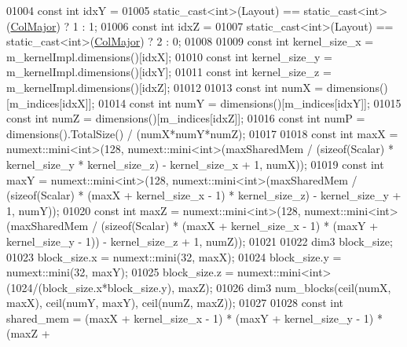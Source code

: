 \begin{DoxyCode}
01004         \textcolor{keyword}{const} \textcolor{keywordtype}{int} idxY =
01005             \textcolor{keyword}{static\_cast<}\textcolor{keywordtype}{int}\textcolor{keyword}{>}(Layout) == static\_cast<int>(\hyperlink{group__enums_ggaacded1a18ae58b0f554751f6cdf9eb13a0cbd4bdd0abcfc0224c5fcb5e4f6669a}{ColMajor}) ? 1 : 1;
01006         \textcolor{keyword}{const} \textcolor{keywordtype}{int} idxZ =
01007             \textcolor{keyword}{static\_cast<}\textcolor{keywordtype}{int}\textcolor{keyword}{>}(Layout) == static\_cast<int>(\hyperlink{group__enums_ggaacded1a18ae58b0f554751f6cdf9eb13a0cbd4bdd0abcfc0224c5fcb5e4f6669a}{ColMajor}) ? 2 : 0;
01008 
01009         \textcolor{keyword}{const} \textcolor{keywordtype}{int} kernel\_size\_x = m\_kernelImpl.dimensions()[idxX];
01010         \textcolor{keyword}{const} \textcolor{keywordtype}{int} kernel\_size\_y = m\_kernelImpl.dimensions()[idxY];
01011         \textcolor{keyword}{const} \textcolor{keywordtype}{int} kernel\_size\_z = m\_kernelImpl.dimensions()[idxZ];
01012 
01013         \textcolor{keyword}{const} \textcolor{keywordtype}{int} numX = dimensions()[m\_indices[idxX]];
01014         \textcolor{keyword}{const} \textcolor{keywordtype}{int} numY = dimensions()[m\_indices[idxY]];
01015         \textcolor{keyword}{const} \textcolor{keywordtype}{int} numZ = dimensions()[m\_indices[idxZ]];
01016         \textcolor{keyword}{const} \textcolor{keywordtype}{int} numP = dimensions().TotalSize() / (numX*numY*numZ);
01017 
01018         \textcolor{keyword}{const} \textcolor{keywordtype}{int} maxX = numext::mini<int>(128, numext::mini<int>(maxSharedMem / (\textcolor{keyword}{sizeof}(Scalar) * 
      kernel\_size\_y * kernel\_size\_z) - kernel\_size\_x + 1, numX));
01019         \textcolor{keyword}{const} \textcolor{keywordtype}{int} maxY = numext::mini<int>(128, numext::mini<int>(maxSharedMem / (\textcolor{keyword}{sizeof}(Scalar) * (maxX + 
      kernel\_size\_x - 1) * kernel\_size\_z) - kernel\_size\_y + 1, numY));
01020         \textcolor{keyword}{const} \textcolor{keywordtype}{int} maxZ = numext::mini<int>(128, numext::mini<int>(maxSharedMem / (\textcolor{keyword}{sizeof}(Scalar) * (maxX + 
      kernel\_size\_x - 1) * (maxY + kernel\_size\_y - 1)) - kernel\_size\_z + 1, numZ));
01021 
01022         dim3 block\_size;
01023         block\_size.x = numext::mini(32, maxX);
01024         block\_size.y = numext::mini(32, maxY);
01025         block\_size.z = numext::mini<int>(1024/(block\_size.x*block\_size.y), maxZ);
01026         dim3 num\_blocks(ceil(numX, maxX), ceil(numY, maxY), ceil(numZ, maxZ));
01027 
01028         \textcolor{keyword}{const} \textcolor{keywordtype}{int} shared\_mem = (maxX + kernel\_size\_x - 1) * (maxY + kernel\_size\_y - 1) * (maxZ + 

\end{DoxyCode}
